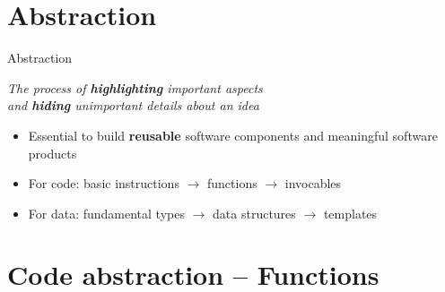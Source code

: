 

\section*{Abstraction}

\begin{frame}{Abstraction}

  \centering\large\textit{The process of \textbf{highlighting} important
    aspects\\and \textbf{hiding} unimportant details about an idea}

  \vfill

  \begin{itemize}
  \item<2-> Essential to build \textbf{reusable} software components and
    meaningful software products
  \item<3-> For code: basic instructions $\to$ functions $\to$ invocables
  \item<4-> For data: fundamental types $\to$ data structures $\to$ templates
  \end{itemize}
\end{frame}

\section*{Code abstraction -- Functions}

